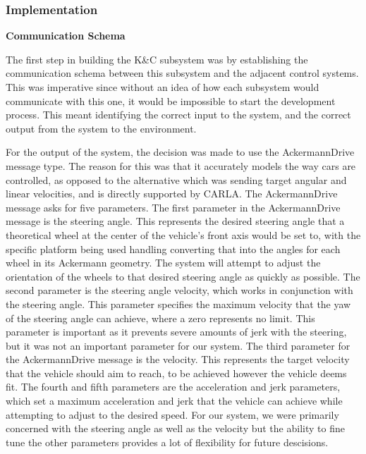 \documentclass[titlepage, draft]{article}
\begin{document}
{\subsubsection{Implementation}
\textbf{Communication Schema}

The first step in building the K\&C subsystem was by establishing the communication schema between this subsystem and the adjacent control systems. This was imperative since without an idea of how each subsystem would communicate with this one, it would be impossible to start the development process. This meant identifying the correct input to the system, and the correct output from the system to the environment.

For the output of the system, the decision was made to use the AckermannDrive message type. The reason for this was that it accurately models the way cars are controlled, as opposed to the alternative which was sending target angular and linear velocities, and is directly supported by CARLA. The AckermannDrive message asks for five parameters. The first parameter in the AckermannDrive message is the steering angle. This represents the desired steering angle that a theoretical wheel at the center of the vehicle's front axis would be set to, with the specific platform being used handling converting that into the angles for each wheel in its Ackermann geometry. The system will attempt to adjust the orientation of the wheels to that desired steering angle as quickly as possible. The second parameter is the steering angle velocity, which works in conjunction with the steering angle. This parameter specifies the maximum velocity that the yaw of the steering angle can achieve, where a zero represents no limit. This parameter is important as it prevents severe amounts of jerk with the steering, but it was not an important parameter for our system. The third parameter for the AckermannDrive message is the velocity. This represents the target velocity that the vehicle should aim to reach, to be achieved however the vehicle deems fit. The fourth and fifth parameters are the acceleration and jerk parameters, which set a maximum acceleration and jerk that the vehicle can achieve while attempting to adjust to the desired speed. For our system, we were primarily concerned with the steering angle as well as the velocity but the ability to fine tune the other parameters provides a lot of flexibility for future descisions.

}
\end{document}
